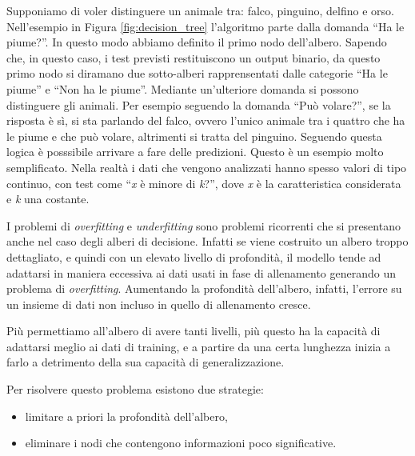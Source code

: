 \documentclass[a4paper,12pt]{report}
\begin{document}
Supponiamo di voler distinguere un animale tra: falco, pinguino, delfino e orso. Nell'esempio in Figura \ref{fig:decision_tree} l'algoritmo parte dalla domanda ``Ha le piume?''. In questo modo abbiamo definito il primo nodo dell'albero. Sapendo che, in questo caso, i test previsti restituiscono un output binario, da questo primo nodo si diramano due sotto-alberi rapprensentati dalle categorie ``Ha le piume'' e ``Non ha le piume''. Mediante un'ulteriore domanda si possono distinguere gli animali. Per esempio seguendo la domanda ``Può volare?'', se la risposta è sì, si sta parlando del falco, ovvero l'unico animale tra i quattro che ha le piume e che può volare, altrimenti si tratta del pinguino. Seguendo questa logica è posssibile arrivare a fare delle predizioni. 
Questo è un esempio molto semplificato. Nella realtà i dati che vengono analizzati hanno spesso valori di tipo continuo, con test come ``\textit{x} è minore di \textit{k}?'', dove \textit{x} è la caratteristica considerata e \textit{k} una costante.

I problemi di \textit{overfitting} e \textit{underfitting} sono problemi ricorrenti che si presentano anche nel caso degli alberi di decisione. Infatti se viene costruito un albero troppo dettagliato, e quindi con un elevato livello di profondità, il modello tende ad adattarsi in maniera eccessiva ai dati usati in fase di allenamento generando un problema di \textit{overfitting}.
Aumentando la profondità dell'albero, infatti, l'errore su un insieme di dati non incluso in quello di allenamento cresce.

Più permettiamo all’albero di avere tanti livelli, più questo ha la capacità di adattarsi meglio ai dati di training, e a partire da una certa lunghezza inizia a farlo a detrimento della sua capacità di generalizzazione. 

Per risolvere questo problema esistono due strategie:
\begin{itemize}
    \item limitare a priori la profondità dell'albero, 
    \item eliminare i nodi che contengono informazioni poco significative.
\end{itemize}

\end{document}
